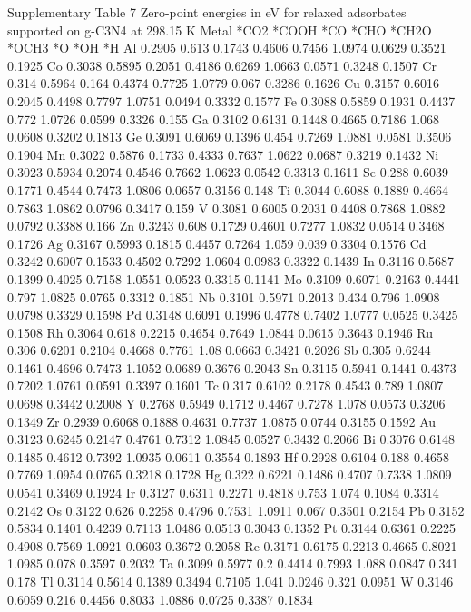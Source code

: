 Supplementary Table 7
Zero-point energies in eV for relaxed adsorbates supported on g-C3N4 at 298.15 K
Metal	*CO2	*COOH	*CO	*CHO	*CH2O	*OCH3	*O	*OH	*H
Al	0.2905	0.613	0.1743	0.4606	0.7456	1.0974	0.0629	0.3521	0.1925
Co	0.3038	0.5895	0.2051	0.4186	0.6269	1.0663	0.0571	0.3248	0.1507
Cr	0.314	0.5964	0.164	0.4374	0.7725	1.0779	0.067	0.3286	0.1626
Cu	0.3157	0.6016	0.2045	0.4498	0.7797	1.0751	0.0494	0.3332	0.1577
Fe	0.3088	0.5859	0.1931	0.4437	0.772	1.0726	0.0599	0.3326	0.155
Ga	0.3102	0.6131	0.1448	0.4665	0.7186	1.068	0.0608	0.3202	0.1813
Ge	0.3091	0.6069	0.1396	0.454	0.7269	1.0881	0.0581	0.3506	0.1904
Mn	0.3022	0.5876	0.1733	0.4333	0.7637	1.0622	0.0687	0.3219	0.1432
Ni	0.3023	0.5934	0.2074	0.4546	0.7662	1.0623	0.0542	0.3313	0.1611
Sc	0.288	0.6039	0.1771	0.4544	0.7473	1.0806	0.0657	0.3156	0.148
Ti	0.3044	0.6088	0.1889	0.4664	0.7863	1.0862	0.0796	0.3417	0.159
V	0.3081	0.6005	0.2031	0.4408	0.7868	1.0882	0.0792	0.3388	0.166
Zn	0.3243	0.608	0.1729	0.4601	0.7277	1.0832	0.0514	0.3468	0.1726
Ag	0.3167	0.5993	0.1815	0.4457	0.7264	1.059	0.039	0.3304	0.1576
Cd	0.3242	0.6007	0.1533	0.4502	0.7292	1.0604	0.0983	0.3322	0.1439
In	0.3116	0.5687	0.1399	0.4025	0.7158	1.0551	0.0523	0.3315	0.1141
Mo	0.3109	0.6071	0.2163	0.4441	0.797	1.0825	0.0765	0.3312	0.1851
Nb	0.3101	0.5971	0.2013	0.434	0.796	1.0908	0.0798	0.3329	0.1598
Pd	0.3148	0.6091	0.1996	0.4778	0.7402	1.0777	0.0525	0.3425	0.1508
Rh	0.3064	0.618	0.2215	0.4654	0.7649	1.0844	0.0615	0.3643	0.1946
Ru	0.306	0.6201	0.2104	0.4668	0.7761	1.08	0.0663	0.3421	0.2026
Sb	0.305	0.6244	0.1461	0.4696	0.7473	1.1052	0.0689	0.3676	0.2043
Sn	0.3115	0.5941	0.1441	0.4373	0.7202	1.0761	0.0591	0.3397	0.1601
Tc	0.317	0.6102	0.2178	0.4543	0.789	1.0807	0.0698	0.3442	0.2008
Y	0.2768	0.5949	0.1712	0.4467	0.7278	1.078	0.0573	0.3206	0.1349
Zr	0.2939	0.6068	0.1888	0.4631	0.7737	1.0875	0.0744	0.3155	0.1592
Au	0.3123	0.6245	0.2147	0.4761	0.7312	1.0845	0.0527	0.3432	0.2066
Bi	0.3076	0.6148	0.1485	0.4612	0.7392	1.0935	0.0611	0.3554	0.1893
Hf	0.2928	0.6104	0.188	0.4658	0.7769	1.0954	0.0765	0.3218	0.1728
Hg	0.322	0.6221	0.1486	0.4707	0.7338	1.0809	0.0541	0.3469	0.1924
Ir	0.3127	0.6311	0.2271	0.4818	0.753	1.074	0.1084	0.3314	0.2142
Os	0.3122	0.626	0.2258	0.4796	0.7531	1.0911	0.067	0.3501	0.2154
Pb	0.3152	0.5834	0.1401	0.4239	0.7113	1.0486	0.0513	0.3043	0.1352
Pt	0.3144	0.6361	0.2225	0.4908	0.7569	1.0921	0.0603	0.3672	0.2058
Re	0.3171	0.6175	0.2213	0.4665	0.8021	1.0985	0.078	0.3597	0.2032
Ta	0.3099	0.5977	0.2	0.4414	0.7993	1.088	0.0847	0.341	0.178
Tl	0.3114	0.5614	0.1389	0.3494	0.7105	1.041	0.0246	0.321	0.0951
W	0.3146	0.6059	0.216	0.4456	0.8033	1.0886	0.0725	0.3387	0.1834


